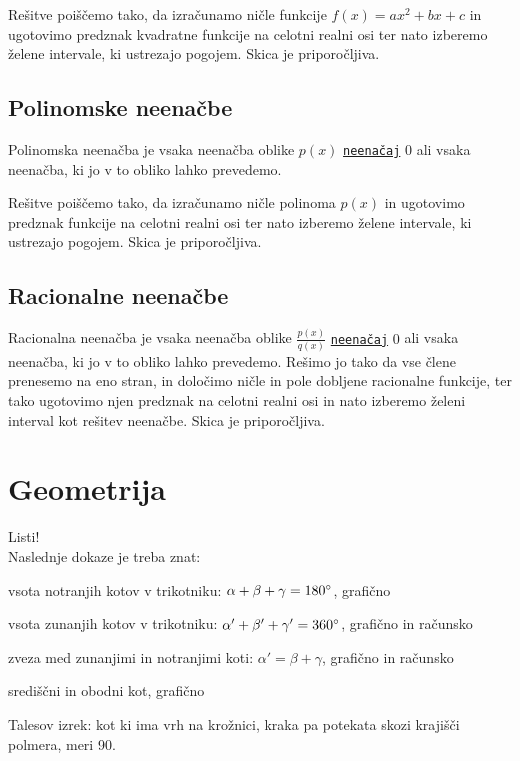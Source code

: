 \documentclass[a4paper,oneside,12pt,fleqn]{article}
\def\deg{\degree}
\numberwithin{equation}{section}
\newenvironment{itemize*}%
{
\vspace{-12pt}%
\begin{itemize}%
\setlength{\itemsep}{0pt}%
\setlength{\parskip}{2pt}}%
{\end{itemize}}
\begin{document}
Rešitve poiščemo tako, da izračunamo ničle funkcije $f(x)
= ax^2 + bx + c$ in ugotovimo predznak kvadratne funkcije na celotni realni osi ter nato 
izberemo želene intervale, ki ustrezajo pogojem. Skica je priporočljiva.

\subsection{Polinomske neenačbe}
\label{sec:neenac:pol}
Polinomska neenačba je vsaka neenačba oblike $p(x)$
\hyperlink{point:neenacaj}{\texttt{neenačaj}} $0$ ali vsaka
neenačba, ki jo v to obliko lahko prevedemo.

Rešitve poiščemo tako, da izračunamo ničle polinoma $p(x)$
in ugotovimo predznak funkcije na celotni realni osi ter nato 
izberemo želene intervale, ki ustrezajo pogojem. Skica je priporočljiva.

\subsection{Racionalne neenačbe}
\label{sec:neenac:rac}
Racionalna neenačba je vsaka neenačba oblike $\frac{p(x)}{q(x)}$
\hyperlink{point:neenacaj}{\texttt{neenačaj}} $0$ ali
vsaka neenačba, ki jo v to obliko lahko prevedemo. Rešimo jo
tako da vse člene prenesemo na eno stran, in določimo ničle in pole dobljene racionalne
funkcije, ter tako ugotovimo njen predznak na celotni realni
osi in nato izberemo želeni interval kot rešitev neenačbe. Skica je priporočljiva.

\section{Geometrija}
\label{sec:geom}
Listi!\\
Naslednje dokaze je treba znat:
\begin{itemize*}
  \item vsota notranjih kotov v trikotniku: $\alpha + \beta + \gamma = 180\deg$, grafično
  \item vsota zunanjih kotov v trikotniku: $\alpha' + \beta' + \gamma' = 360\deg$, grafično in računsko
  \item zveza med zunanjimi in notranjimi koti: $\alpha' = \beta + \gamma$, grafično in računsko
  \item središčni in obodni kot, grafično
  \item Talesov izrek: kot ki ima vrh na krožnici, kraka pa potekata skozi krajišči
    polmera, meri 90\deg.
\end{itemize*}
\end{document}
